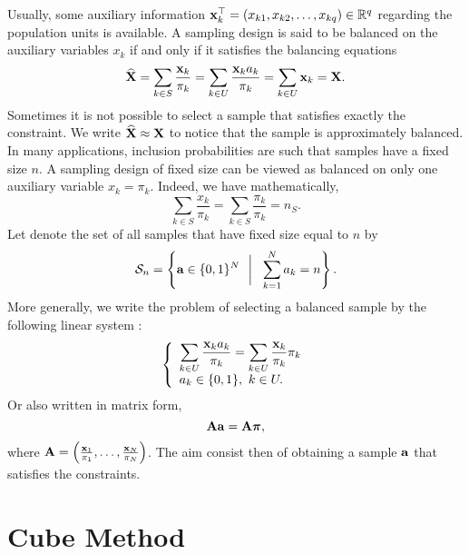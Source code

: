 \documentclass[12pt,english]{article}\usepackage[]{graphicx}\usepackage{xcolor}
\begin{document}
Usually, some auxiliary information ${\bf x}_k^\top = (x_{k1},x_{k2},\dots,x_{kq}) \in\mathbb{R}^q$  regarding the population units is available. A sampling design is said to be balanced on the auxiliary variables $x_k$ if and only if it satisfies the balancing equations
\begin{equation*}\label{eq:balance}
  \widehat{{\bf X}} = \sum_{k\in S} \frac{{\bf x}_k}{\pi_k}  =  \sum_{k\in U} \frac{{\bf x}_k a_k}{\pi_k}= \sum_{k\in U} {\bf x}_k = {\bf X}.
\end{equation*}
Sometimes it is not possible to select a sample that satisfies exactly the constraint. We write $\widehat{{\bf X}} \approx {\bf X}$  to notice that the sample is approximately balanced. In many applications, inclusion probabilities are such that samples have a fixed size $n$. A sampling design of fixed size can be viewed as balanced on only one auxiliary variable $x_k = \pi_k$. Indeed, we have mathematically,
\begin{equation*}
\sum_{k\in S} \frac{x_k}{\pi_k} = \sum_{k \in S}\frac{\pi_k}{\pi_k} =  n_S.
\end{equation*}
Let denote the set of all samples that have fixed size equal to $n$ by
 \begin{equation*}\label{eq:sn} \mathcal{S}_n = \left\{ \textbf{a}\in \{0,1\}^N ~~\bigg|~~ \sum_{k
= 1}^N a_k = n \right\} .
 \end{equation*}
More generally, we write the problem of selecting a balanced sample by the following linear system :
\begin{equation*}\left\{\begin{array}{lll}
\displaystyle\sum_{k\in U}\frac{{\bf x}_k a_k}{\pi_k} =\sum_{k\in U} \frac{{\bf x}_k}{\pi_k}\pi_k\\
a_k \in\{0,1\}, ~ k\in U.

\end{array}\right.
\end{equation*}
Or also written in matrix form,
\begin{equation}\label{eq:bal} {\bf A}{\bf a} = {\bf A}\boldsymbol{\pi},
\end{equation}
where ${\bf A}= \left( \frac{{\bf x}_1}{\pi_1},\dots, \frac{{\bf x}_N}{\pi_N}\right)$. The aim consist then of obtaining a sample ${\bf a}$ that satisfies the constraints.

\section{Cube Method}
\end{document}
